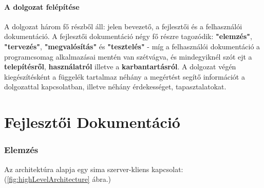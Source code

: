 \documentclass[twoside, a4paper, 12pt]{article}
\begin{document}
\subsection{A dolgozat felépítése}
A dolgozat három fő részből áll: jelen bevezető, a fejlesztői és a felhasználói dokumentáció.
A fejlesztői dokumentáció négy fő részre tagozódik: \textbf{"elemzés"}, \textbf{"tervezés"}, \textbf{"megvalósítás"} és \textbf{"tesztelés"} - míg a felhasználói dokumentáció a programcsomag alkalmazásai mentén van szétvágva, és mindegyiknél szót ejt a \textbf{telepítésről}, \textbf{használatról} illetve a \textbf{karbantartásról}.
A dolgozat végén kiegészítésként a függelék tartalmaz néhány a megértést segítő információt a dolgozattal kapcsolatban, illetve néhány érdekességet, tapasztalatokat.











































\newpage
\part{Fejlesztői Dokumentáció}
\section{Elemzés}

Az architektúra alapja egy sima szerver-kliens kapcsolat: (\ref{fig:highLevelArchitecture} ábra.)
\end{document}
